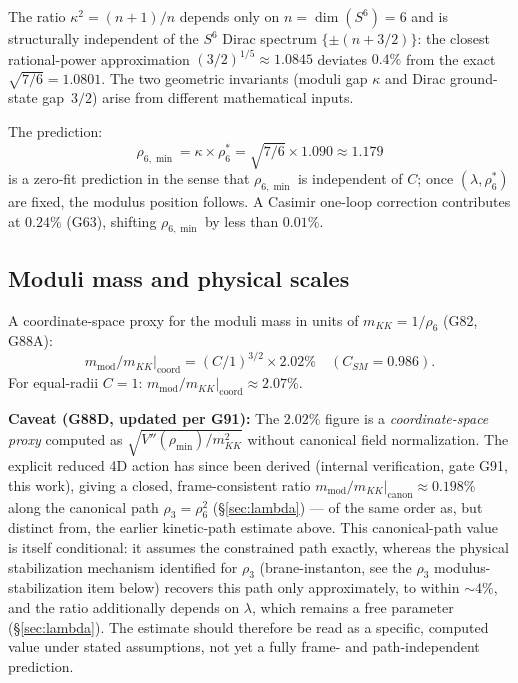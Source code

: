 \documentclass[12pt,a4paper]{article}
\begin{document}
The ratio $\kappa^2=(n+1)/n$ depends only on $n=\dim(S^6)=6$ and is structurally independent
of the $S^6$ Dirac spectrum $\{\pm(n+3/2)\}$: the closest rational-power approximation
$(3/2)^{1/5}\approx 1.0845$ deviates $0.4\%$ from the exact $\sqrt{7/6}=1.0801$. The two
geometric invariants (moduli gap $\kappa$ and Dirac ground-state gap~$3/2$) arise from
different mathematical inputs.

The prediction:
\begin{equation}
  \boxed{\rho_{6,\min} = \kappa\times\rho_6^* = \sqrt{7/6}\times 1.090 \approx 1.179}
  \tag{G62}
\end{equation}
is a zero-fit prediction in the sense that $\rho_{6,\min}$ is independent of $C$;
once $(\lambda, \rho_6^*)$ are fixed, the modulus position follows. A Casimir one-loop
correction contributes at $0.24\%$ (G63), shifting $\rho_{6,\min}$ by less than $0.01\%$.

\subsection{Moduli mass and physical scales}

A coordinate-space proxy for the moduli mass in units of $m_{KK}=1/\rho_6$ (G82, G88A):
\begin{equation}
  m_{\mathrm{mod}}/m_{KK}\big|_{\mathrm{coord}} = (C/1)^{3/2}\times 2.02\% \quad (C_{SM}=0.986).
\end{equation}
For equal-radii $C=1$: $m_{\mathrm{mod}}/m_{KK}|_{\mathrm{coord}}\approx 2.07\%$.

\textbf{Caveat (G88D, updated per G91):} The $2.02\%$ figure is a \emph{coordinate-space
proxy} computed as $\sqrt{V''(\rho_{\min})/m_{KK}^2}$ without canonical field
normalization. The explicit reduced 4D action has since been derived (internal
verification, gate G91, this work), giving a closed, frame-consistent ratio
$m_{\mathrm{mod}}/m_{KK}|_{\mathrm{canon}}\approx 0.198\%$ along the canonical path
$\rho_3=\rho_6^2$ (\S\ref{sec:lambda}) --- of the same order as, but distinct from, the
earlier kinetic-path estimate above. This canonical-path value is itself conditional:
it assumes the constrained path exactly, whereas the physical stabilization mechanism
identified for $\rho_3$ (brane-instanton, see the $\rho_3$ modulus-stabilization item
below) recovers this path only approximately, to within $\sim\!4\%$, and the ratio
additionally depends on $\lambda$, which remains a free parameter (\S\ref{sec:lambda}).
The estimate should therefore be read as a specific, computed value under stated
assumptions, not yet a fully frame- and path-independent prediction.
\end{document}
